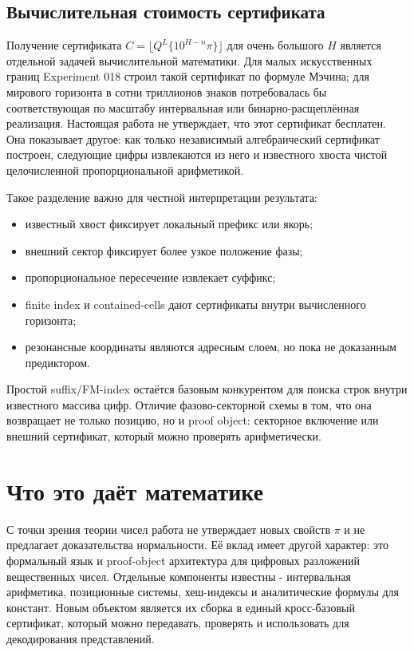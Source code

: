 \documentclass[11pt,a4paper]{article}
\begin{document}
\subsection*{Вычислительная стоимость сертификата}
Получение сертификата $C=\lfloor Q^L\{10^{H-n}\pi\}\rfloor$ для очень большого $H$ является отдельной задачей вычислительной математики.  Для малых искусственных границ Experiment 018 строил такой сертификат по формуле Мэчина; для мирового горизонта в сотни триллионов знаков потребовалась бы соответствующая по масштабу интервальная или бинарно-расщеплённая реализация.  Настоящая работа не утверждает, что этот сертификат бесплатен.  Она показывает другое: как только независимый алгебраический сертификат построен, следующие цифры извлекаются из него и известного хвоста чистой целочисленной пропорциональной арифметикой.

Такое разделение важно для честной интерпретации результата:
\begin{itemize}[leftmargin=2em]
  \item известный хвост фиксирует локальный префикс или якорь;
  \item внешний сектор фиксирует более узкое положение фазы;
  \item пропорциональное пересечение извлекает суффикс;
  \item finite index и contained-cells дают сертификаты внутри вычисленного горизонта;
  \item резонансные координаты являются адресным слоем, но пока не доказанным предиктором.
\end{itemize}

Простой suffix/FM-index остаётся базовым конкурентом для поиска строк внутри известного массива цифр.  Отличие фазово-секторной схемы в том, что она возвращает не только позицию, но и proof object: секторное включение или внешний сертификат, который можно проверять арифметически.



\section{Что это даёт математике}

С точки зрения теории чисел работа не утверждает новых свойств $\pi$ и не предлагает доказательства нормальности.  Её вклад имеет другой характер: это формальный язык и proof-object архитектура для цифровых разложений вещественных чисел.  Отдельные компоненты известны - интервальная арифметика, позиционные системы, хеш-индексы и аналитические формулы для констант.  Новым объектом является их сборка в единый кросс-базовый сертификат, который можно передавать, проверять и использовать для декодирования представлений.
\end{document}
